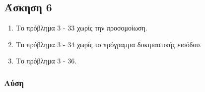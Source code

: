 \newpage\subsection*{Άσκηση 6}

\begin{enumerate}
        
\item[\textbf{\en{i.}}] Το  πρόβλημα  3 - 33  χωρίς  την  προσομοίωση.
\item[\textbf{\en{ii.}}] Το πρόβλημα 3 - 34 χωρίς το πρόγραμμα δοκιμαστικής εισόδου.
\item[\textbf{\en{iii.}}] Το πρόβλημα 3 - 36. 

\end{enumerate}

\subsubsection*{Λύση}

